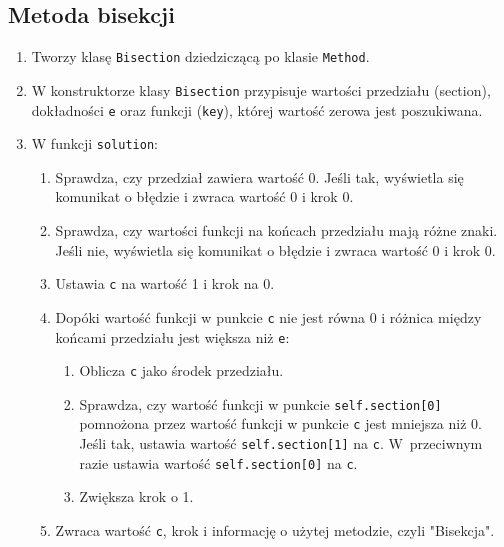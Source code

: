 \documentclass[12pt]{article}
\begin{document}
\subsection{Metoda bisekcji}
\begin{enumerate}
\item Tworzy klasę \verb|Bisection| dziedziczącą po klasie \verb|Method|.
\item W konstruktorze klasy \verb|Bisection| przypisuje wartości przedziału (section), dokładności \verb|e| oraz funkcji (\verb|key|), której wartość zerowa jest poszukiwana.
\item W funkcji \verb|solution|:
\begin{enumerate}
\item Sprawdza, czy przedział zawiera wartość 0. Jeśli tak, wyświetla się komunikat o błędzie i zwraca wartość 0 i krok 0.
\item Sprawdza, czy wartości funkcji na końcach przedziału mają różne znaki. Jeśli nie, wyświetla się komunikat o błędzie i zwraca wartość 0 i krok 0.
\item Ustawia \verb|c| na wartość 1 i krok na 0.
\item Dopóki wartość funkcji w punkcie \verb|c| nie jest równa 0 i różnica między końcami przedziału jest większa niż \verb|e|:
\begin{enumerate}
\item Oblicza \verb|c| jako środek przedziału.
\item Sprawdza, czy wartość funkcji w punkcie \verb|self.section[0]| pomnożona przez wartość funkcji w punkcie \verb|c| jest mniejsza niż 0. Jeśli tak, ustawia wartość \verb|self.section[1]| na \verb|c|. W~przeciwnym razie ustawia wartość \verb|self.section[0]| na \verb|c|.
\item Zwiększa krok o 1.
\end{enumerate}
\item Zwraca wartość \verb|c|, krok i informację o użytej metodzie, czyli "Bisekcja".
\end{enumerate}
\end{enumerate}
\end{document}
